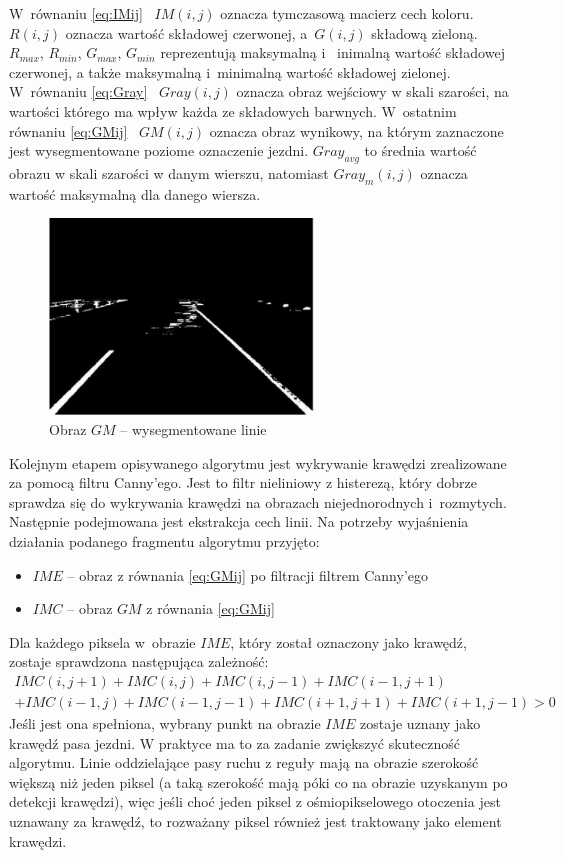 W~równaniu \eqref{eq:IMij} \ ${IM(i,j)}$ oznacza tymczasową macierz cech koloru. ${R(i,j)}$ oznacza wartość składowej czerwonej, a~${G(i,j)}$ składową zieloną. 
${R_{max}}$, ${R_{min}}$, ${G_{max}}$, ${G_{min}}$ reprezentują maksymalną i ~inimalną wartość składowej czerwonej, a także maksymalną i~minimalną wartość składowej zielonej. 
W~równaniu \eqref{eq:Gray} \ $ Gray(i,j)$ oznacza obraz wejściowy w skali szarości, na wartości którego ma wpływ każda ze składowych barwnych. 
W~ostatnim równaniu \eqref{eq:GMij} \ $GM(i,j)$ oznacza obraz wynikowy, na którym zaznaczone jest wysegmentowane poziome oznaczenie jezdni. 
$Gray_{avg}$ to średnia wartość obrazu w skali szarości w danym wierszu, natomiast $Gray_{m}(i,j)$ oznacza wartość maksymalną dla danego wiersza.

\begin{figure}
  \centering
  \includegraphics[width=7cm]{img/segmentacja.png}
  \caption{Obraz $GM$ -- wysegmentowane linie\cite{T3}}
  \label{fig:segmented}
\end{figure}


Kolejnym etapem opisywanego algorytmu jest wykrywanie krawędzi zrealizowane za pomocą filtru Canny'ego. 
Jest to filtr nieliniowy z histerezą, który dobrze sprawdza się do wykrywania krawędzi na obrazach niejednorodnych i~rozmytych. 
Następnie podejmowana jest ekstrakcja cech linii. 
Na potrzeby wyjaśnienia działania podanego fragmentu algorytmu przyjęto:
\begin{itemize}
\item $IME$ -- obraz z równania \eqref{eq:GMij} po filtracji filtrem Canny'ego
\item $IMC$ -- obraz $GM$ z równania \eqref{eq:GMij}
\end{itemize}

Dla każdego piksela w~obrazie $IME$, który został oznaczony jako krawędź, zostaje sprawdzona następująca zależność:
\begin{equation}
	\begin{matrix}
	IMC(i,j+1)+IMC(i,j)+IMC(i,j-1)+IMC(i-1,j+1)\\
	+IMC(i-1,j)+IMC(i-1,j-1)+IMC(i+1,j+1)+IMC(i+1,j-1)>0
	\end{matrix}
\end{equation}
Jeśli jest ona spełniona, wybrany punkt na obrazie $IME$ zostaje uznany jako krawędź pasa jezdni.
W praktyce ma to za zadanie zwiększyć skuteczność algorytmu. 
Linie oddzielające pasy ruchu z reguły mają na obrazie szerokość większą niż jeden piksel (a taką szerokość mają póki co na obrazie uzyskanym po detekcji krawędzi), więc jeśli choć jeden piksel z ośmiopikselowego otoczenia jest uznawany za krawędź, to rozważany piksel również jest traktowany jako element krawędzi.

